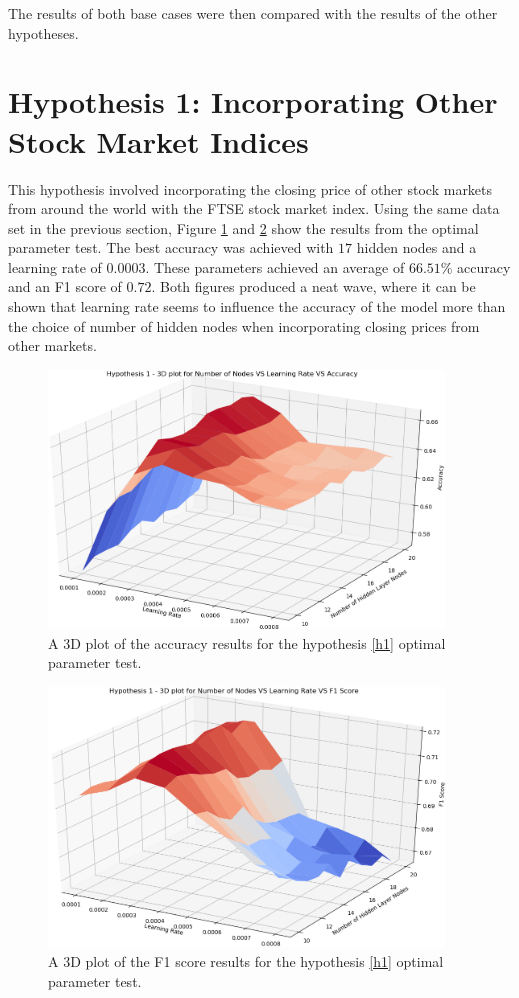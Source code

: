 \documentclass{UoYCSproject}
\begin{document}
The results of both base cases were then compared with the results of the other hypotheses.

\section{Hypothesis 1: Incorporating Other Stock Market Indices}
This hypothesis involved incorporating the closing price of other stock markets from around the world with the FTSE stock market index. Using the same data set in the previous section, Figure \ref{fig:h1_plot_accuracy} and \ref{fig:h1_plot_f1} show the results from the optimal parameter test. The best accuracy was achieved with $17$ hidden nodes and a learning rate of $0.0003$. These parameters achieved an average of $66.51$\% accuracy and an F1 score of $0.72$. Both figures produced a neat wave, where it can be shown that learning rate seems to influence the accuracy of the model more than the choice of number of hidden nodes when incorporating closing prices from other markets. 

\begin{figure}[h]
\includegraphics[width=10.5cm]{h1_accuracy.png}
\centering
\caption{A 3D plot of the accuracy results for the hypothesis \ref{h1} optimal parameter test.} 
\label{fig:h1_plot_accuracy}
\end{figure}

\begin{figure}[h]
\includegraphics[width=10.5cm]{h1_f1.png}
\centering
\caption{A 3D plot of the F1 score results for the hypothesis \ref{h1} optimal parameter test.} 
\label{fig:h1_plot_f1}
\end{figure}
\end{document}
